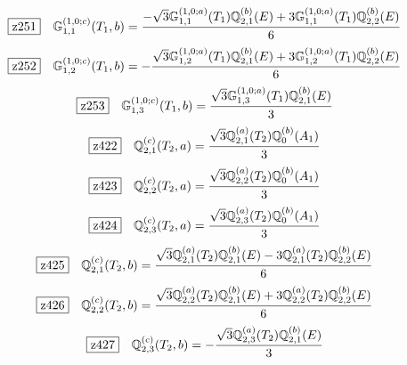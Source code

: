 \documentclass[fleqn,10pt,landscape]{jsarticle}
\begin{document}
\begin{dmath*}
\hspace*{3mm}\fbox{z251}\quad \mathbb{G}_{1,1}^{(1,0;c)}(T_{1},b)=\frac{- \sqrt{3} \mathbb{G}_{1,1}^{(1,0;a)}(T_{1}) \mathbb{Q}_{2,1}^{(b)}(E) + 3 \mathbb{G}_{1,1}^{(1,0;a)}(T_{1}) \mathbb{Q}_{2,2}^{(b)}(E)}{6}
\end{dmath*}
\begin{dmath*}
\hspace*{3mm}\fbox{z252}\quad \mathbb{G}_{1,2}^{(1,0;c)}(T_{1},b)=- \frac{\sqrt{3} \mathbb{G}_{1,2}^{(1,0;a)}(T_{1}) \mathbb{Q}_{2,1}^{(b)}(E) + 3 \mathbb{G}_{1,2}^{(1,0;a)}(T_{1}) \mathbb{Q}_{2,2}^{(b)}(E)}{6}
\end{dmath*}
\begin{dmath*}
\hspace*{3mm}\fbox{z253}\quad \mathbb{G}_{1,3}^{(1,0;c)}(T_{1},b)=\frac{\sqrt{3} \mathbb{G}_{1,3}^{(1,0;a)}(T_{1}) \mathbb{Q}_{2,1}^{(b)}(E)}{3}
\end{dmath*}
\begin{dmath*}
\hspace*{3mm}\fbox{z422}\quad \mathbb{Q}_{2,1}^{(c)}(T_{2},a)=\frac{\sqrt{3} \mathbb{Q}_{2,1}^{(a)}(T_{2}) \mathbb{Q}_{0}^{(b)}(A_{1})}{3}
\end{dmath*}
\begin{dmath*}
\hspace*{3mm}\fbox{z423}\quad \mathbb{Q}_{2,2}^{(c)}(T_{2},a)=\frac{\sqrt{3} \mathbb{Q}_{2,2}^{(a)}(T_{2}) \mathbb{Q}_{0}^{(b)}(A_{1})}{3}
\end{dmath*}
\begin{dmath*}
\hspace*{3mm}\fbox{z424}\quad \mathbb{Q}_{2,3}^{(c)}(T_{2},a)=\frac{\sqrt{3} \mathbb{Q}_{2,3}^{(a)}(T_{2}) \mathbb{Q}_{0}^{(b)}(A_{1})}{3}
\end{dmath*}
\begin{dmath*}
\hspace*{3mm}\fbox{z425}\quad \mathbb{Q}_{2,1}^{(c)}(T_{2},b)=\frac{\sqrt{3} \mathbb{Q}_{2,1}^{(a)}(T_{2}) \mathbb{Q}_{2,1}^{(b)}(E) - 3 \mathbb{Q}_{2,1}^{(a)}(T_{2}) \mathbb{Q}_{2,2}^{(b)}(E)}{6}
\end{dmath*}
\begin{dmath*}
\hspace*{3mm}\fbox{z426}\quad \mathbb{Q}_{2,2}^{(c)}(T_{2},b)=\frac{\sqrt{3} \mathbb{Q}_{2,2}^{(a)}(T_{2}) \mathbb{Q}_{2,1}^{(b)}(E) + 3 \mathbb{Q}_{2,2}^{(a)}(T_{2}) \mathbb{Q}_{2,2}^{(b)}(E)}{6}
\end{dmath*}
\begin{dmath*}
\hspace*{3mm}\fbox{z427}\quad \mathbb{Q}_{2,3}^{(c)}(T_{2},b)=- \frac{\sqrt{3} \mathbb{Q}_{2,3}^{(a)}(T_{2}) \mathbb{Q}_{2,1}^{(b)}(E)}{3}
\end{dmath*}
\end{document}
